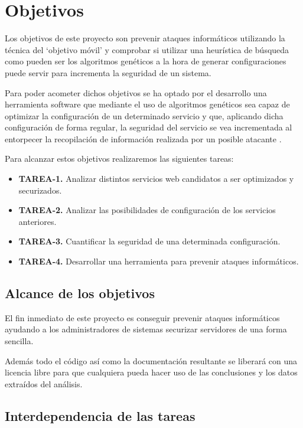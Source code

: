 \chapter{Objetivos}

Los objetivos de este proyecto son prevenir ataques informáticos utilizando la técnica del `objetivo móvil' y comprobar si utilizar una heurística de búsqueda como pueden ser los algoritmos genéticos a la hora de generar configuraciones puede servir para incrementa la seguridad de un sistema.

\bigskip
Para poder acometer dichos objetivos se ha optado por el desarrollo una herramienta software que mediante el uso de algoritmos genéticos sea capaz de optimizar la configuración de un determinado servicio y que, aplicando dicha configuración de forma regular, la seguridad del servicio se vea incrementada al entorpecer la recopilación de información realizada por un posible atacante \cite{john_evolutionary_2014}.

\bigskip
Para alcanzar estos objetivos realizaremos las siguientes tareas:

\begin{itemize}
  \item \textbf{TAREA-1.} Analizar distintos servicios web candidatos a ser optimizados y securizados.
  \item \textbf{TAREA-2.} Analizar las posibilidades de configuración de los servicios anteriores.
  \item \textbf{TAREA-3.} Cuantificar la seguridad de una determinada configuración.
  \item \textbf{TAREA-4.} Desarrollar una herramienta para prevenir ataques informáticos.
\end{itemize}

\section{Alcance de los objetivos}
El fin inmediato de este proyecto es conseguir prevenir ataques informáticos ayudando a los administradores de sistemas securizar servidores de una forma sencilla.

\bigskip
Además todo el código así como la documentación resultante se liberará con una licencia libre para que cualquiera pueda hacer uso de las conclusiones y los datos extraídos del análisis.

\section{Interdependencia de las tareas}

